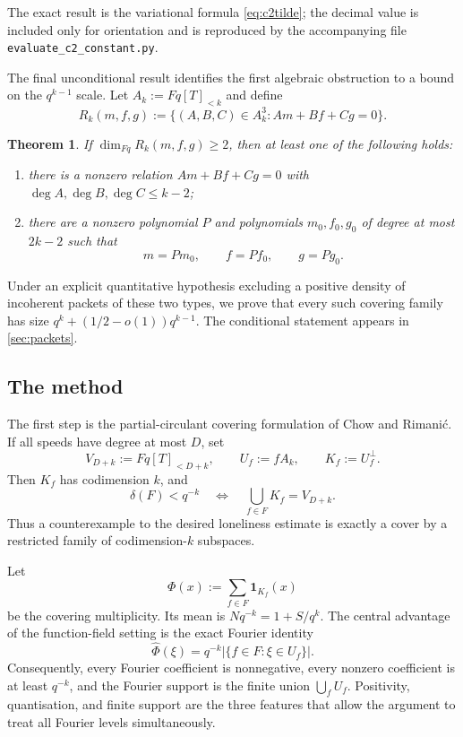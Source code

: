 \documentclass[11pt,reqno]{amsart}
\numberwithin{equation}{section}
\newtheorem{theorem}{Theorem}[section]
\theoremstyle{definition}
\theoremstyle{remark}
\newcommand{\Fq}{\mathbb F_q}
\newcommand{\one}{\mathbf 1}
\newcommand{\cF}{\mathcal F}
\newcommand{\cR}{\mathcal R}
\newcommand{\wh}{\widehat}
\newcommand{\abs}[1]{\lvert#1\rvert}
\newcommand{\set}[1]{\{#1\}}
\def\Fq{Fq}%
\def\mathbb#1{#1}%
\def\mathcal#1{#1}%
\begin{document}
The exact result is the variational formula \eqref{eq:c2tilde}; the decimal value is included only for orientation and is reproduced by the accompanying file
\texttt{evaluate\_c2\_constant.py}.

The final unconditional result identifies the first algebraic obstruction to a bound on the $q^{k-1}$ scale.  Let
$A_k:=\Fq[T]_{<k}$ and define
\begin{equation}\label{eq:Rk-intro}
 \cR_k(m,f,g)
 :=\set{(A,B,C)\in A_k^3:Am+Bf+Cg=0}.
\end{equation}

\begin{theorem}\label{thm:syzygy-intro}
If $\dim_{\Fq}\cR_k(m,f,g)\ge2$, then at least one of the following holds:
\begin{enumerate}[label=\textup{(\roman*)}]
 \item there is a nonzero relation
 $Am+Bf+Cg=0$ with
 $\deg A,\deg B,\deg C\le k-2$;
 \item there are a nonzero polynomial $P$ and polynomials
 $m_0,f_0,g_0$ of degree at most $2k-2$ such that
 \[
  m=Pm_0,
  \qquad
  f=Pf_0,
  \qquad
  g=Pg_0.
 \]
\end{enumerate}
\end{theorem}

Under an explicit quantitative hypothesis excluding a positive density of incoherent packets of these two types, we prove that every such covering family has size
$q^k+(1/2-o(1))q^{k-1}$.  The conditional statement appears in \cref{sec:packets}.

\subsection{The method}

The first step is the partial-circulant covering formulation of Chow and Rimani\'c.  If all speeds have degree at most $D$, set
\[
 V_{D+k}:=\Fq[T]_{<D+k},
 \qquad
 U_f:=fA_k,
 \qquad
 K_f:=U_f^\perp.
\]
Then $K_f$ has codimension $k$, and
\[
 \delta(\cF)<q^{-k}
 \quad\Longleftrightarrow\quad
 \bigcup_{f\in\cF}K_f=V_{D+k}.
\]
Thus a counterexample to the desired loneliness estimate is exactly a cover by a restricted family of codimension-$k$ subspaces.

Let
\[
 \Phi(x):=\sum_{f\in\cF}\one_{K_f}(x)
\]
be the covering multiplicity.  Its mean is
$Nq^{-k}=1+S/q^k$.  The central advantage of the function-field setting is the exact Fourier identity
\begin{equation}\label{eq:exact-Fourier-intro}
 \wh\Phi(\xi)
 =q^{-k}\abs{\set{f\in\cF:\xi\in U_f}}.
\end{equation}
Consequently, every Fourier coefficient is nonnegative, every nonzero coefficient is at least $q^{-k}$, and the Fourier support is the finite union
$\bigcup_fU_f$.  Positivity, quantisation, and finite support are the three features that allow the argument to treat all Fourier levels simultaneously.
\end{document}

